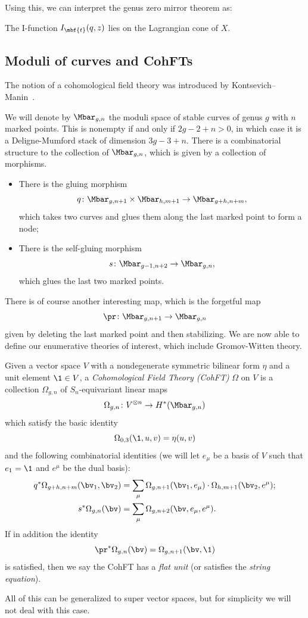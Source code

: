 Using this, we can interpret the genus zero mirror theorem as:
\begin{thm}
    The I-function \(I_{\mbf{t}}(q,z)\) lies on the Lagrangian cone of \(X\).
\end{thm}




\subsection{Moduli of curves and CohFTs}%
\label{sub:Moduli of curves and CohFTs}

The notion of a cohomological field theory was introduced by Kontsevich--Manin~\cite{KM1994}.

We will denote by $\Mbar_{g,n}$ the moduli space of stable curves of genus $g$ with $n$ marked points. This is nonempty if and only if $2g-2+n > 0$, in which case it is a Deligne-Mumford stack of dimension $3g-3+n$. There is a combinatorial structure to the collection of $\Mbar_{g,n}$, which is given by a collection of morphisms.
\begin{itemize}
    \item There is the gluing morphism 
        \[q \colon \Mbar_{g,n+1} \times \Mbar_{h, m+1} \to \Mbar_{g+h,n+m}, \] 
        which takes two curves and glues them along the last marked point to form a node;
    \item There is the self-gluing morphism \[s \colon \Mbar_{g-1,n+2} \to \Mbar_{g,n},\] 
        which glues the last two marked points.
\end{itemize}
There is of course another interesting map, which is the forgetful map
\[ \pr \colon \Mbar_{g,n+1} \to \Mbar_{g,n} \]
given by deleting the last marked point and then stabilizing. We are now able to define our enumerative theories of interest, which include Gromov-Witten theory.

\begin{defn}
    Given a vector space $V$ with a nondegenerate symmetric bilinear form $\eta$ and a unit element $\1 \in V$, a \textit{Cohomological Field Theory (CohFT)} $\Omega$ on $V$ is a collection $\Omega_{g,n}$ of $S_n$-equivariant linear maps
    \[ \Omega_{g,n} \colon V^{\otimes n} \to H^*(\Mbar_{g,n}) \]
    which satisfy the basic identity
    \[ \Omega_{0,3}(\1, u,v) = \eta(u,v) \]
    and the following combinatorial identities (we will let $e_{\mu}$ be a basis of $V$ such that $e_1 = \1$ and $e^{\mu}$ be the dual basis):
    \begin{align*}
        q^* \Omega_{g+h,n+m}(\bv_1, \bv_2) &= \sum_{\mu} \Omega_{g,n+1}(\bv_1, e_{\mu}) \cdot \Omega_{h,m+1}(  \bv_2, e^{\mu} ); \\
        s^* \Omega_{g,n}(\bv) &= \sum_{\mu} \Omega_{g,n+2}(\bv, e_{\mu}, e^{\mu}).
    \end{align*}
    If in addition the identity
    \[ \pr^*\Omega_{g,n}(\bv) = \Omega_{g,n+1}(\bv,\1) \]
    is satisfied, then we say the CohFT has a \textit{flat unit} (or satisfies the \textit{string equation}).
\end{defn}
All of this can be generalized to super vector spaces, but for simplicity we will not deal with this case.

